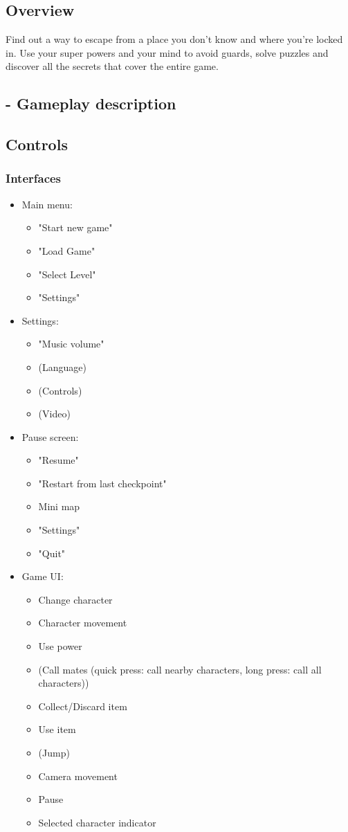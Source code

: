 \subsection{Overview}
Find out a way to escape from a place you don’t know and where you’re locked in. Use your super powers and your mind to avoid guards, solve puzzles and discover all the secrets that cover the entire game.

\subsection{- Gameplay description}


\subsection{Controls}
\subsubsection{Interfaces}
\begin{itemize}  
\item Main menu: \begin{itemize}  
			\item "Start new game"
			\item "Load Game"
			\item "Select Level"
			\item "Settings"
			\end{itemize}
\item Settings:	\begin{itemize}  
			\item "Music volume"
			\item (Language)
			\item (Controls)
			\item (Video)
			\end{itemize}
\item Pause screen:	\begin{itemize}  
				\item "Resume"
				\item "Restart from last checkpoint"
				\item Mini map
				\item "Settings"
				\item "Quit"
				\end{itemize}
\item Game UI: \begin{itemize}  
			\item Change character
			\item Character movement
			\item Use power
			\item (Call mates (quick press: call nearby characters, long press: call all characters))
			\item Collect/Discard item
			\item Use item
			\item (Jump)
			\item Camera movement
			\item Pause
			\item Selected character indicator
			\end{itemize}
\end{itemize}

